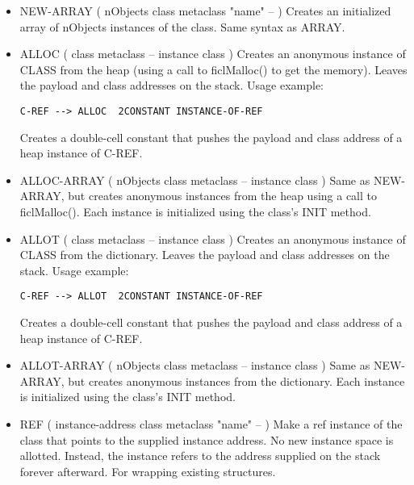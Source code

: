 \begin{;stlisting}[frame=single]
\begin{itemize}[noitemsep]
	\item NEW-ARRAY ( nObjects class metaclass "name" -- )\newline
	Creates an initialized array of nObjects instances of the class.
	Same syntax as ARRAY.

	\item ALLOC ( class metaclass -- instance class )\newline
	Creates an anonymous instance of CLASS from the heap (using a
	call to ficlMalloc() to get the memory). Leaves the payload and
	class addresses on the stack. Usage example:
\begin{lstlisting}[frame=single]
C-REF --> ALLOC  2CONSTANT INSTANCE-OF-REF
\end{lstlisting}
	Creates a double-cell constant that pushes the payload and class
	address of a heap instance of C-REF.

	\item ALLOC-ARRAY ( nObjects class metaclass -- instance
		class )\newline
	Same as NEW-ARRAY, but creates anonymous instances from the heap
	using a call to ficlMalloc(). Each instance is initialized using
	the class's INIT method.

	\item ALLOT ( class metaclass -- instance class )\newline
	Creates an anonymous instance of CLASS from the dictionary.
	Leaves the payload and class addresses on the stack. Usage
	example:
\begin{lstlisting}[frame=single]
C-REF --> ALLOT  2CONSTANT INSTANCE-OF-REF
\end{lstlisting}
	Creates a double-cell constant that pushes the payload and class
	address of a heap instance of C-REF.

	\item ALLOT-ARRAY ( nObjects class metaclass -- instance
		class )\newline
	Same as NEW-ARRAY, but creates anonymous instances from the
	dictionary. Each instance is initialized using the class's INIT
	method.

	\item REF ( instance-address class metaclass "name" -- )\newline
	Make a ref instance of the class that points to the supplied
	instance address. No new instance space is allotted. Instead,
	the instance refers to the address supplied on the stack forever
	afterward. For wrapping existing structures.


\end{itemize}
\end{;stlisting}
